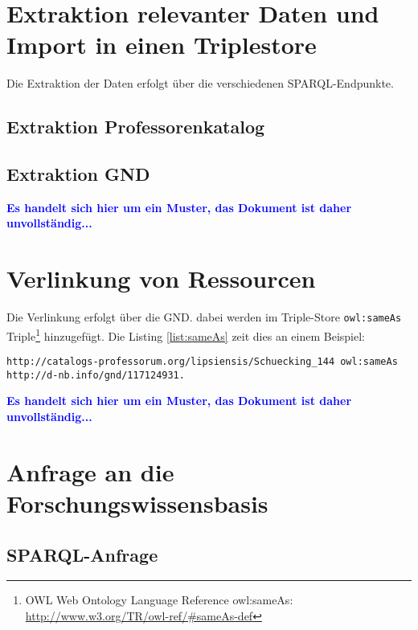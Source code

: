\documentclass[a4paper,10pt,parskip]{article}
\begin{document}
\section{Extraktion relevanter Daten und Import in einen Triplestore }

Die Extraktion der Daten erfolgt über die verschiedenen SPARQL-Endpunkte.

\subsection{Extraktion Professorenkatalog}

\subsection{Extraktion GND}


\vspace{0.5cm}\textcolor{blue}{\textbf{Es handelt sich hier um ein Muster, das Dokument ist daher unvollständig...}}

\section{Verlinkung von Ressourcen}

Die Verlinkung erfolgt über die GND. dabei werden im Triple-Store \verb+owl:sameAs+ Triple\footnote{OWL Web Ontology Language Reference owl:sameAs: \url{http://www.w3.org/TR/owl-ref/\#sameAs-def}} hinzugefügt. Die Listing \ref{list:sameAs} zeit dies an einem Beispiel:

\begin{lstlisting}[caption={Beispiel für die Verwendung von owl:sameAS}, label={list:sameAs}]
http://catalogs-professorum.org/lipsiensis/Schuecking_144 owl:sameAs http://d-nb.info/gnd/117124931.
\end{lstlisting}


\vspace{0.5cm}\textcolor{blue}{\textbf{Es handelt sich hier um ein Muster, das Dokument ist daher unvollständig...}}

\section{Anfrage an die Forschungswissensbasis}

\subsection{SPARQL-Anfrage}
\end{document}
